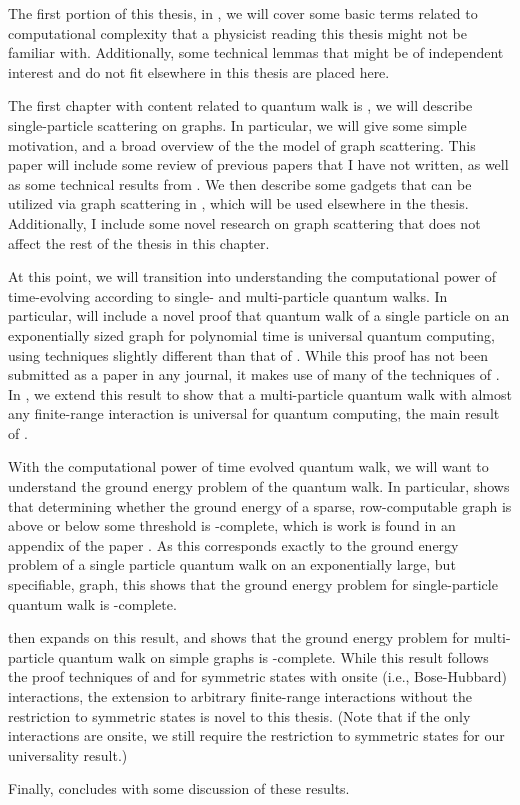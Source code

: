 \documentclass[../thesis-main/thesis-main]{subfiles}
\begin{document}
The first portion of this thesis, in , we will cover some basic terms related to computational complexity that a physicist reading this thesis might not be familiar with.  Additionally, some technical lemmas that might be of independent interest and do not fit elsewhere in this thesis are placed here.

The first chapter with content related to quantum walk is , we will describe single-particle scattering on graphs.  In particular, we will give some simple motivation, and a broad overview of the the model of graph scattering.  This paper will include some review of previous papers \cite{Chi09,CG12} that I have not written, as well as some technical results from \cite{MPQW}.  We then describe some gadgets that can be utilized via graph scattering in , which will be used elsewhere in the thesis.  Additionally, I include some novel research on graph scattering that does not affect the rest of the thesis in this chapter.

At this point, we will transition into understanding the computational power of time-evolving according to single- and multi-particle quantum walks.  In particular,  will include a novel proof that quantum walk of a single particle on an exponentially sized graph for polynomial time is universal quantum computing, using techniques slightly different than that of \cite{Chi09}.  While this proof has not been submitted as a paper in any journal, it makes use of many of the techniques of \cite{MPQW}.  In , we extend this result to show that a multi-particle quantum walk with almost any finite-range interaction is universal for quantum computing, the main result of \cite{MPQW}.

With the computational power of time evolved quantum walk, we will want to understand the ground energy problem of the quantum walk.  In particular,  shows that determining whether the ground energy of a sparse, row-computable graph is above or below some threshold is \QMA-complete, which is work is found in an appendix of the paper \cite{BHQMA}.  As this corresponds exactly to the ground energy problem of a single particle quantum walk on an exponentially large, but specifiable, graph, this shows that the ground energy problem for single-particle quantum walk is \QMA-complete. 

 then expands on this result, and shows that the ground energy problem for multi-particle quantum walk on simple graphs is \QMA-complete.  While this result follows the proof techniques of \cite{MPQW} and \cite{XYQMA} for symmetric states with onsite (i.e., Bose-Hubbard) interactions, the extension to arbitrary finite-range interactions without the restriction to symmetric states is novel to this thesis. (Note that if the only interactions are onsite, we still require the restriction to symmetric states for our universality result.)

Finally,  concludes with some discussion of these results.


\biblio{}
\end{document}
